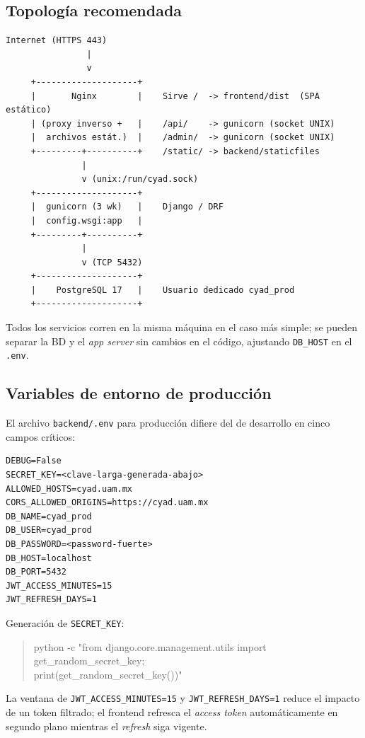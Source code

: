 \documentclass{computacion}
\begin{document}
\subsection{Topología recomendada}

\begin{Verbatim}[fontsize=\small, frame=single]
        Internet (HTTPS 443)
                |
                v
     +--------------------+
     |       Nginx        |    Sirve /  -> frontend/dist  (SPA estático)
     | (proxy inverso +   |    /api/    -> gunicorn (socket UNIX)
     |  archivos estát.)  |    /admin/  -> gunicorn (socket UNIX)
     +---------+----------+    /static/ -> backend/staticfiles
               |
               v (unix:/run/cyad.sock)
     +--------------------+
     |  gunicorn (3 wk)   |    Django / DRF
     |  config.wsgi:app   |
     +---------+----------+
               |
               v (TCP 5432)
     +--------------------+
     |    PostgreSQL 17   |    Usuario dedicado cyad_prod
     +--------------------+
\end{Verbatim}

Todos los servicios corren en la misma máquina en el caso más simple; se pueden separar la BD y el \emph{app server} sin cambios en el código, ajustando \texttt{DB\_HOST} en el \texttt{.env}.

\subsection{Variables de entorno de producción}

El archivo \texttt{backend/.env} para producción difiere del de desarrollo en cinco campos críticos:

\begin{Verbatim}[fontsize=\small, frame=single]
DEBUG=False
SECRET_KEY=<clave-larga-generada-abajo>
ALLOWED_HOSTS=cyad.uam.mx
CORS_ALLOWED_ORIGINS=https://cyad.uam.mx
DB_NAME=cyad_prod
DB_USER=cyad_prod
DB_PASSWORD=<password-fuerte>
DB_HOST=localhost
DB_PORT=5432
JWT_ACCESS_MINUTES=15
JWT_REFRESH_DAYS=1
\end{Verbatim}

Generación de \texttt{SECRET\_KEY}:

\begin{quote}\ttfamily
python -c "from django.core.management.utils import get\_random\_secret\_key; \\
print(get\_random\_secret\_key())"
\end{quote}

La ventana de \texttt{JWT\_ACCESS\_MINUTES=15} y \texttt{JWT\_REFRESH\_DAYS=1} reduce el impacto de un token filtrado; el frontend refresca el \emph{access token} automáticamente en segundo plano mientras el \emph{refresh} siga vigente.
\end{document}
